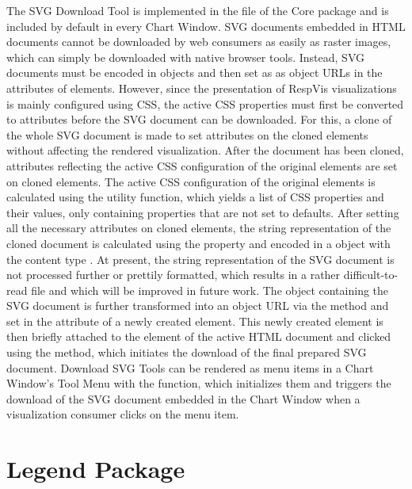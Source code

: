 The SVG Download Tool is implemented in the
 file of the Core package and is
included by default in every Chart Window. SVG documents embedded in
HTML documents cannot be downloaded by web consumers as easily as
raster images, which can simply be downloaded with native browser
tools. Instead, SVG documents must be encoded in  objects
and then set as as object URLs in the  attributes of
 elements. However, since the presentation of RespVis
visualizations is mainly configured using CSS, the active CSS
properties must first be converted to attributes before the SVG
document can be downloaded. For this, a clone of the whole SVG
document is made to set attributes on the cloned elements without
affecting the rendered visualization. After the document has been
cloned, attributes reflecting the active CSS configuration of the
original elements are set on cloned elements. The active CSS
configuration of the original elements is calculated using the
 utility function, which
yields a list of CSS properties and their values, only containing
properties that are not set to defaults. After setting all the
necessary attributes on cloned elements, the string representation of
the cloned document is calculated using the 
property and encoded in a  object with the content type
. At present, the string representation of the SVG
document is not processed further or prettily formatted, which results
in a rather difficult-to-read file and which will be improved in
future work. The  object containing the SVG document is
further transformed into an object URL via the
 method and set in the  attribute
of a newly created  element. This newly created
 element is then briefly attached to the 
element of the active HTML document and clicked using the
 method, which initiates the download of the final
prepared SVG document. Download SVG Tools can be rendered as menu
items in a Chart Window's Tool Menu with the
 function, which initializes them and
triggers the download of the SVG document embedded in the Chart Window
when a visualization consumer clicks on the menu item.





\section{Legend Package}

